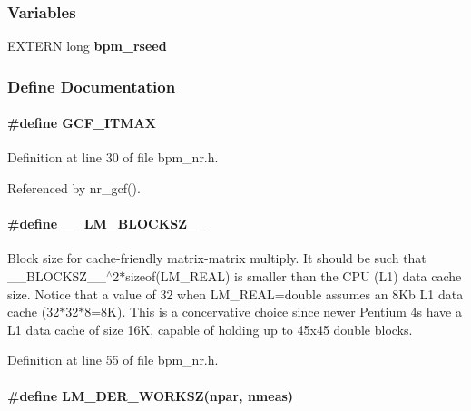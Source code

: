 \subsubsection*{Variables}
\begin{CompactItemize}
\item 
EXTERN long \textbf{bpm\_\-rseed}\label{group__nr_ga0d31375f4ee67d90ba46fbda872d25c}

\end{CompactItemize}


\subsubsection{Define Documentation}
\paragraph[GCF\_\-ITMAX]{\setlength{\rightskip}{0pt plus 5cm}\#define GCF\_\-ITMAX}\hfill\label{group__nr_g237e3fb6d3de48307c71905e9c3d7af6}




Definition at line 30 of file bpm\_\-nr.h.

Referenced by nr\_\-gcf().
\paragraph[\_\-\_\-LM\_\-BLOCKSZ\_\-\_\-]{\setlength{\rightskip}{0pt plus 5cm}\#define \_\-\_\-LM\_\-BLOCKSZ\_\-\_\-}\hfill\label{group__nr_gc14076a88ccb8264dbbc4043b9d34c57}


Block size for cache-friendly matrix-matrix multiply. It should be such that \_\-\_\-BLOCKSZ\_\-\_\-$^\wedge$2$\ast$sizeof(LM\_\-REAL) is smaller than the CPU (L1) data cache size. Notice that a value of 32 when LM\_\-REAL=double assumes an 8Kb L1 data cache (32$\ast$32$\ast$8=8K). This is a concervative choice since newer Pentium 4s have a L1 data cache of size 16K, capable of holding up to 45x45 double blocks. 

Definition at line 55 of file bpm\_\-nr.h.
\paragraph[LM\_\-DER\_\-WORKSZ]{\setlength{\rightskip}{0pt plus 5cm}\#define LM\_\-DER\_\-WORKSZ(npar, \/  nmeas)}\hfill\label{group__nr_gd7b3e71cd42d088fe82889448cb5b835}


